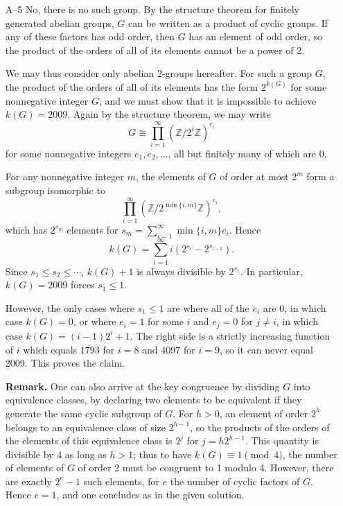 \documentclass[amssymb,twocolumn,pra,10pt,aps]{revtex4-1}
\newcommand{\ZZ}{\mathbb{Z}}
\begin{document}
\begin{itemize}
\item[A--5]
No, there is no such group.
By the structure theorem for finitely generated abelian groups,
$G$ can be written as a product of cyclic groups.
If any of these factors has odd order, then $G$ has an element of odd order,
so the product of the orders of all of its elements cannot be a power of 2.

We may thus consider only abelian $2$-groups hereafter.
For such a group $G$, the product of the orders of all of its elements
has the form $2^{k(G)}$ for some nonnegative integer $G$, and we must show
that it is impossible to achieve $k(G) = 2009$.
Again by the structure theorem, we may write
\[
G \cong \prod_{i=1}^\infty (\ZZ/2^i \ZZ)^{e_i}
\]
for some nonnegative integers $e_1,e_2,\dots$, all but finitely many of
which are $0$.

For any nonnegative integer $m$, the elements of $G$ of order at most $2^m$
form a subgroup isomorphic to
\[
\prod_{i=1}^\infty (\ZZ/2^{\min\{i,m\}} \ZZ)^{e_i},
\]
which has $2^{s_m}$ elements for $s_m = \sum_{i=1}^\infty \min\{i,m\} e_i$.
Hence
\[
k(G) = \sum_{i=1}^\infty i(2^{s_i} - 2^{s_{i-1}}).
\]
Since $s_1 \leq s_2 \leq \cdots$, $k(G)+1$ is always divisible by $2^{s_1}$.
In particular, $k(G) = 2009$ forces $s_1 \leq 1$.

However, the only cases where $s_1 \leq 1$ are where all of the $e_i$ are $0$,
in which case $k(G) = 0$, or where $e_i = 1$ for some $i$ and $e_j = 0$
for $j \neq i$, in which case $k(G) = (i-1)2^i + 1$.
The right side is a strictly increasing function
of $i$ which equals $1793$ for $i=8$ and $4097$ for $i=9$, so it can never equal
2009. This proves the claim.

\textbf{Remark.} One can also arrive at the key congruence by dividing $G$
into equivalence classes, by declaring two elements to be equivalent if they generate the
same cyclic subgroup of $G$.
For $h>0$, an element of order $2^h$ belongs to an equivalence class of size $2^{h-1}$,
so the products of the orders of the elements of this equivalence class is $2^j$
for $j = h 2^{h-1}$. This quantity is divisible by 4 as long as $h > 1$;
thus to have $k(G) \equiv 1 \pmod{4}$, the number of elements of $G$ of order 2 must be
congruent to 1 modulo 4. However, there are exactly $2^e-1$ such elements,
for $e$ the number of cyclic factors of $G$. Hence $e = 1$, and one concludes as in the
given solution.


\end{itemize}
\end{document}
